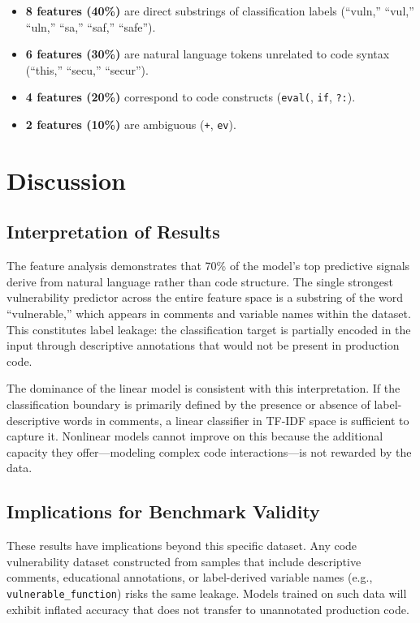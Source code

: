 \documentclass[11pt,a4paper]{article}
\begin{document}
\begin{itemize}
    \item \textbf{8 features (40\%)} are direct substrings of classification labels (``vuln,'' ``vul,'' ``uln,'' ``sa,'' ``saf,'' ``safe'').
    \item \textbf{6 features (30\%)} are natural language tokens unrelated to code syntax (``this,'' ``secu,'' ``secur'').
    \item \textbf{4 features (20\%)} correspond to code constructs (\texttt{eval(}, \texttt{if}, \texttt{?:}).
    \item \textbf{2 features (10\%)} are ambiguous (\texttt{+}, \texttt{ev}).
\end{itemize}

\section{Discussion}

\subsection{Interpretation of Results}

The feature analysis demonstrates that 70\% of the model's top predictive signals derive from natural language rather than code structure. The single strongest vulnerability predictor across the entire feature space is a substring of the word ``vulnerable,'' which appears in comments and variable names within the dataset. This constitutes label leakage: the classification target is partially encoded in the input through descriptive annotations that would not be present in production code.

The dominance of the linear model is consistent with this interpretation. If the classification boundary is primarily defined by the presence or absence of label-descriptive words in comments, a linear classifier in TF-IDF space is sufficient to capture it. Nonlinear models cannot improve on this because the additional capacity they offer---modeling complex code interactions---is not rewarded by the data.

\subsection{Implications for Benchmark Validity}

These results have implications beyond this specific dataset. Any code vulnerability dataset constructed from samples that include descriptive comments, educational annotations, or label-derived variable names (e.g., \texttt{vulnerable\_function}) risks the same leakage. Models trained on such data will exhibit inflated accuracy that does not transfer to unannotated production code.
\end{document}

